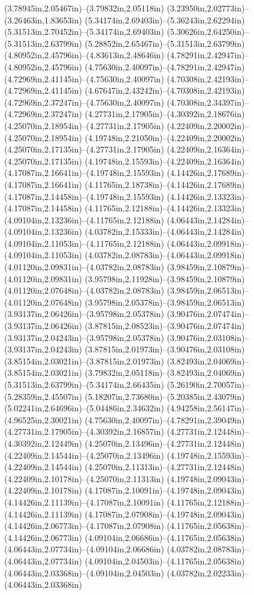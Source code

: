 (3.78945in,2.05467in)--(3.79832in,2.05118in) (3.23950in,2.02773in)--(3.26463in,1.83653in) (5.34174in,2.69403in)--(5.36243in,2.62294in) (5.31513in,2.70452in)--(5.34174in,2.69403in) (5.30626in,2.64250in)--(5.31513in,2.63799in) (5.28852in,2.65467in)--(5.31513in,2.63799in) (4.80952in,2.45796in)--(4.83613in,2.48646in) (4.78291in,2.42947in)--(4.80952in,2.45796in) (4.75630in,2.40097in)--(4.78291in,2.42947in) (4.72969in,2.41145in)--(4.75630in,2.40097in) (4.70308in,2.42193in)--(4.72969in,2.41145in) (4.67647in,2.43242in)--(4.70308in,2.42193in) (4.72969in,2.37247in)--(4.75630in,2.40097in) (4.70308in,2.34397in)--(4.72969in,2.37247in) (4.27731in,2.17905in)--(4.30392in,2.18676in) (4.25070in,2.18954in)--(4.27731in,2.17905in) (4.22409in,2.20002in)--(4.25070in,2.18954in) (4.19748in,2.21050in)--(4.22409in,2.20002in) (4.25070in,2.17135in)--(4.27731in,2.17905in) (4.22409in,2.16364in)--(4.25070in,2.17135in) (4.19748in,2.15593in)--(4.22409in,2.16364in) (4.17087in,2.16641in)--(4.19748in,2.15593in) (4.14426in,2.17689in)--(4.17087in,2.16641in) (4.11765in,2.18738in)--(4.14426in,2.17689in) (4.17087in,2.14458in)--(4.19748in,2.15593in) (4.14426in,2.13323in)--(4.17087in,2.14458in) (4.11765in,2.12188in)--(4.14426in,2.13323in) (4.09104in,2.13236in)--(4.11765in,2.12188in) (4.06443in,2.14284in)--(4.09104in,2.13236in) (4.03782in,2.15333in)--(4.06443in,2.14284in) (4.09104in,2.11053in)--(4.11765in,2.12188in) (4.06443in,2.09918in)--(4.09104in,2.11053in) (4.03782in,2.08783in)--(4.06443in,2.09918in) (4.01120in,2.09831in)--(4.03782in,2.08783in) (3.98459in,2.10879in)--(4.01120in,2.09831in) (3.95798in,2.11928in)--(3.98459in,2.10879in) (4.01120in,2.07648in)--(4.03782in,2.08783in) (3.98459in,2.06513in)--(4.01120in,2.07648in) (3.95798in,2.05378in)--(3.98459in,2.06513in) (3.93137in,2.06426in)--(3.95798in,2.05378in) (3.90476in,2.07474in)--(3.93137in,2.06426in) (3.87815in,2.08523in)--(3.90476in,2.07474in) (3.93137in,2.04243in)--(3.95798in,2.05378in) (3.90476in,2.03108in)--(3.93137in,2.04243in) (3.87815in,2.01973in)--(3.90476in,2.03108in) (3.85154in,2.03021in)--(3.87815in,2.01973in) (3.82493in,2.04069in)--(3.85154in,2.03021in) (3.79832in,2.05118in)--(3.82493in,2.04069in) (5.31513in,2.63799in)--(5.34174in,2.66435in) (5.26190in,2.70057in)--(5.28359in,2.45507in) (5.18207in,2.73680in)--(5.20385in,2.43079in) (5.02241in,2.64696in)--(5.04486in,2.34632in) (4.94258in,2.56147in)--(4.96525in,2.30021in) (4.75630in,2.40097in)--(4.78291in,2.39049in) (4.27731in,2.17905in)--(4.30392in,2.16857in) (4.27731in,2.12448in)--(4.30392in,2.12449in) (4.25070in,2.13496in)--(4.27731in,2.12448in) (4.22409in,2.14544in)--(4.25070in,2.13496in) (4.19748in,2.15593in)--(4.22409in,2.14544in) (4.25070in,2.11313in)--(4.27731in,2.12448in) (4.22409in,2.10178in)--(4.25070in,2.11313in) (4.19748in,2.09043in)--(4.22409in,2.10178in) (4.17087in,2.10091in)--(4.19748in,2.09043in) (4.14426in,2.11139in)--(4.17087in,2.10091in) (4.11765in,2.12188in)--(4.14426in,2.11139in) (4.17087in,2.07908in)--(4.19748in,2.09043in) (4.14426in,2.06773in)--(4.17087in,2.07908in) (4.11765in,2.05638in)--(4.14426in,2.06773in) (4.09104in,2.06686in)--(4.11765in,2.05638in) (4.06443in,2.07734in)--(4.09104in,2.06686in) (4.03782in,2.08783in)--(4.06443in,2.07734in) (4.09104in,2.04503in)--(4.11765in,2.05638in) (4.06443in,2.03368in)--(4.09104in,2.04503in) (4.03782in,2.02233in)--(4.06443in,2.03368in) 